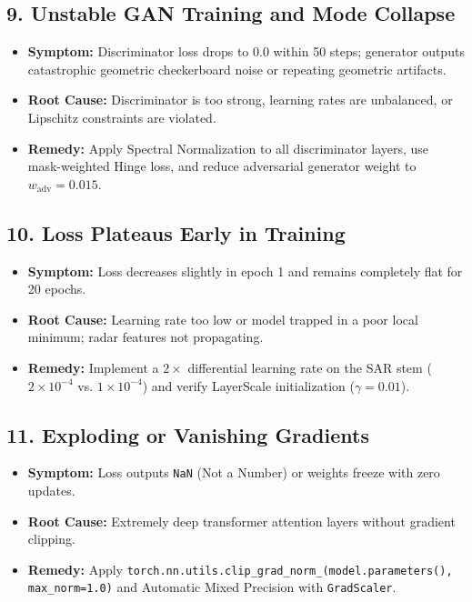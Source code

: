 \subsection{9. Unstable GAN Training and Mode Collapse}
\begin{itemize}
    \item \textbf{Symptom:} Discriminator loss drops to 0.0 within 50 steps; generator outputs catastrophic geometric checkerboard noise or repeating geometric artifacts.
    \item \textbf{Root Cause:} Discriminator is too strong, learning rates are unbalanced, or Lipschitz constraints are violated.
    \item \textbf{Remedy:} Apply Spectral Normalization to all discriminator layers, use mask-weighted Hinge loss, and reduce adversarial generator weight to $w_{\text{adv}} = 0.015$.
\end{itemize}

\subsection{10. Loss Plateaus Early in Training}
\begin{itemize}
    \item \textbf{Symptom:} Loss decreases slightly in epoch 1 and remains completely flat for 20 epochs.
    \item \textbf{Root Cause:} Learning rate too low or model trapped in a poor local minimum; radar features not propagating.
    \item \textbf{Remedy:} Implement a $2\times$ differential learning rate on the SAR stem ($2 \times 10^{-4}$ vs. $1 \times 10^{-4}$) and verify LayerScale initialization ($\gamma = 0.01$).
\end{itemize}

\subsection{11. Exploding or Vanishing Gradients}
\begin{itemize}
    \item \textbf{Symptom:} Loss outputs \texttt{NaN} (Not a Number) or weights freeze with zero updates.
    \item \textbf{Root Cause:} Extremely deep transformer attention layers without gradient clipping.
    \item \textbf{Remedy:} Apply \texttt{torch.nn.utils.clip\_grad\_norm\_(model.parameters(), max\_norm=1.0)} and Automatic Mixed Precision with \texttt{GradScaler}.
\end{itemize}

